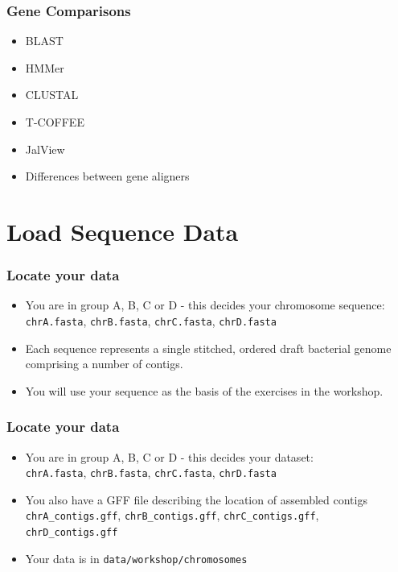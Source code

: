 \documentclass[table]{beamer}
\begin{document}
    \begin{frame}
     \frametitle{Gene Comparisons}
     \begin{itemize}
       \item BLAST
       \item HMMer
       \item CLUSTAL
       \item T-COFFEE
       \item JalView
       \item Differences between gene aligners
     \end{itemize}
    \end{frame}


  \section{Load Sequence Data}
  \begin{frame}
    \frametitle{Locate your data}
    \begin{itemize}
      \item You are in group A, B, C or D - this decides your chromosome sequence: \\
      \texttt{chrA.fasta}, \texttt{chrB.fasta}, \texttt{chrC.fasta}, \texttt{chrD.fasta}
      \item Each sequence represents a single stitched, ordered draft bacterial genome comprising a number of contigs.
      \item You will use your sequence as the basis of the exercises in the workshop.
    \end{itemize}
  \end{frame}  
  
  \begin{frame}
    \frametitle{Locate your data}
    \begin{itemize}
      \item You are in group A, B, C or D - this decides your dataset: \\
      \texttt{chrA.fasta}, \texttt{chrB.fasta}, \texttt{chrC.fasta}, \texttt{chrD.fasta}
      \item You also have a GFF file describing the location of assembled contigs \\
      \texttt{chrA\_contigs.gff}, \texttt{chrB\_contigs.gff}, \texttt{chrC\_contigs.gff}, \texttt{chrD\_contigs.gff}
      \item Your data is in \texttt{data/workshop/chromosomes}
    \end{itemize}
  \end{frame}    
  
\end{document}
